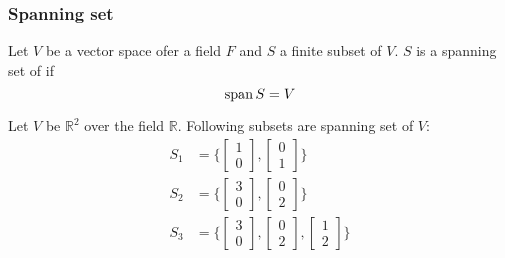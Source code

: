 \subsubsection{Spanning set}
Let \(V\) be a vector space ofer a field \(F\) and \(S\) a finite subset of \(V\). \(S\) is a spanning set of if
\begin{equation}
    \operatorname{span} S = V
\end{equation}
\begin{example}
    Let \(V\) be \(\mathbb{R}^2\) over the field \(\mathbb{R}\). Following subsets are spanning set of \(V\):
    \begin{align*}
        S_1 & = \{ \begin{bmatrix}
            1 \\ 0
        \end{bmatrix},
        \begin{bmatrix} 0 \\ 1 \end{bmatrix}
        \}                                     \\
        S_2 & = \{ \begin{bmatrix}
            3 \\ 0
        \end{bmatrix},
        \begin{bmatrix} 0 \\ 2 \end{bmatrix}
        \}                                     \\
        S_3 & = \{ \begin{bmatrix}
            3 \\ 0
        \end{bmatrix},
        \begin{bmatrix} 0 \\ 2 \end{bmatrix},
        \begin{bmatrix} 1 \\ 2 \end{bmatrix}
        \}
    \end{align*}
\end{example}
